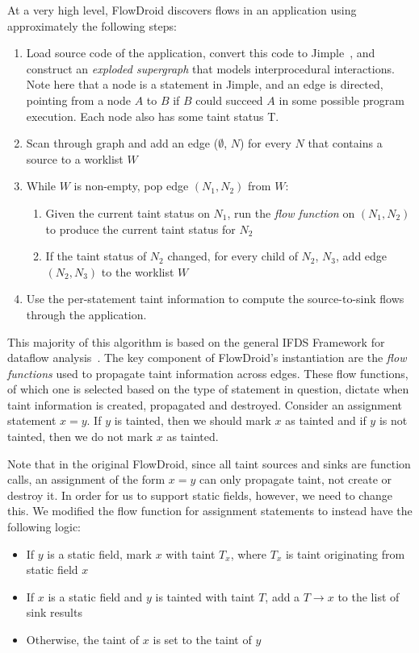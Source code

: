 At a very high level, FlowDroid discovers flows in an application using approximately the following steps:
\begin{enumerate}
\item Load source code of the application, convert this code to Jimple~\cite{soot}, and construct an \emph{exploded supergraph} that models interprocedural interactions. Note here that a node is a statement in Jimple, and an edge is directed, pointing from a node $A$ to $B$ if $B$ could succeed $A$ in some possible program execution. Each node also has some taint status T.
\item Scan through graph and add an edge ($\emptyset$, $N$) for every $N$ that contains a source to a worklist $W$
\item While $W$ is non-empty, pop edge $(N_1, N_2)$ from $W$:
\begin{enumerate}
\item Given the current taint status on $N_1$, run the \emph{flow function} on $(N_1, N_2)$ to produce the current taint status for $N_2$
\item If the taint status of $N_2$ changed, for every child of $N_2$, $N_3$, add edge $(N_2, N_3)$ to the worklist $W$
\end{enumerate}
\item Use the per-statement taint information to compute the source-to-sink flows through the application.
\end{enumerate}

This majority of this algorithm is based on the general IFDS Framework for dataflow analysis~\cite{ifds}. The key component of FlowDroid's instantiation are the \emph{flow functions} used to propagate taint information across edges. These flow functions, of which one is selected based on the type of statement in question, dictate when taint information is created, propagated and destroyed. Consider an assignment statement $x = y$. If $y$ is tainted, then we should mark $x$ as tainted and if $y$ is not tainted, then we do not mark $x$ as tainted. 

Note that in the original FlowDroid, since all taint sources and sinks are function calls, an assignment of the form $x = y$ can only propagate taint, not create or destroy it. In order for us to support static fields, however, we need to change this. We modified the flow function for assignment statements to instead have the following logic:

\begin{itemize}
\item If $y$ is a static field, mark $x$ with taint $T_x$, where $T_x$ is taint originating from static field $x$
\item If $x$ is a static field and $y$ is tainted with taint $T$, add a $T\rightarrow x$ to the list of sink results
\item Otherwise, the taint of $x$ is set to the taint of $y$
\end{itemize}

